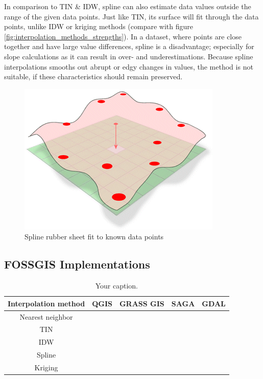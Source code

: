 In comparison to TIN \& IDW, spline can also estimate data values outside the range of the given data points. Just like TIN, its surface will fit through the data points, unlike IDW or kriging methods (compare with figure \ref{fig:interpolation_methods_strengths}). In a dataset, where points are close together and have large value differences, spline is a disadvantage; especially for slope calculations as it can result in over- and underestimations. \cite{wasser_going_2020} Because spline interpolations smooths out abrupt or \ldq{}edgy\rdq{} changes in values, the method is not suitable, if these characteristics should remain preserved.

\begin{figure}
	\centering
	\includegraphics[width=.5\linewidth]{images/spline.png}
	\caption{Spline \ldq{}rubber sheet\rdq{} fit to known data points \cite{albrecht_spline_2005}}
	\label{fig:spline}
\end{figure}


\subsection{FOSSGIS Implementations}

\begin{table}[b!]
	\centering
	\begin{tabular}{c|c|c|c|c}
		Interpolation method & QGIS & GRASS GIS & SAGA & GDAL\\
		\hline
		Nearest neighbor & \xmark &\cmark &\cmark & \cmark \\
		\hline
		TIN & \cmark &\cmark &\cmark & \cmark \\
		\hline
		IDW & \cmark &\cmark &\cmark & \cmark \\
		\hline
		Spline & \xmark &\cmark &\cmark & \xmark \\
		\hline
		Kriging & \xmark &\cmark &\cmark & \xmark \\
	\end{tabular}
	\caption{\label{tab:table-name}Your caption.}
\end{table}







